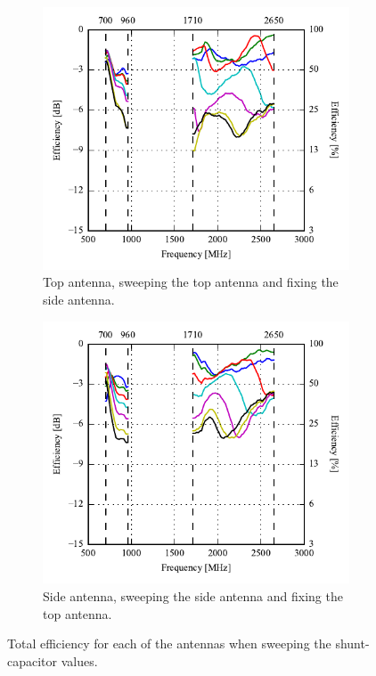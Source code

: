 \begin{figure}[htbp]
    \centering
    \begin{subfigure}{0.49\linewidth}
        \includegraphics{img/tech_sol/trianglefeed/mockup/sweep_efficiency_top.pdf}
        \caption{Top antenna, sweeping the top antenna and fixing the side antenna.}
    \end{subfigure}
    \hfill
    \begin{subfigure}{0.49\linewidth}
        \includegraphics{img/tech_sol/trianglefeed/mockup/sweep_efficiency_side.pdf}
        \caption{Side antenna, sweeping the side antenna and fixing the top antenna.}
    \end{subfigure}
    \caption{Total efficiency for each of the antennas when sweeping the shunt-capacitor values.}
    \label{fig:triang_proto_sweep_efficiency}
\end{figure}

